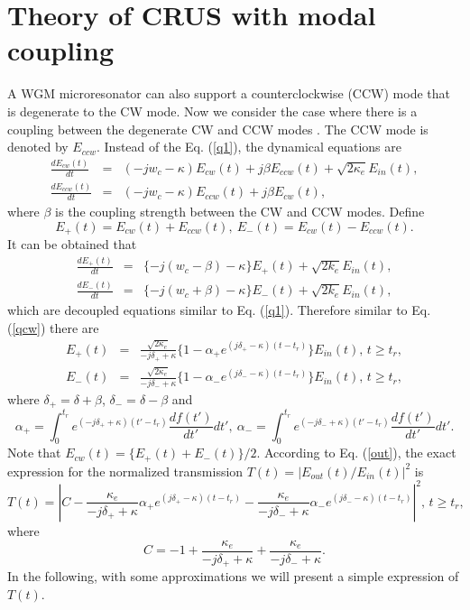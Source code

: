 \documentclass[aps,onecolumn,superscriptaddress,showpacs]{revtex4}
\begin{document}
\section{Theory of CRUS with modal coupling}
A WGM microresonator can also support a counterclockwise (CCW) mode that is degenerate to the CW mode.
Now we consider the case where there is a coupling
between the degenerate CW and CCW modes  \cite{kippenberg2002}. The CCW mode is denoted by $E_{ccw}$. Instead of the Eq. (\ref{q1}), the dynamical equations are  \cite{kippenberg2002}
\begin{eqnarray}
\frac{dE_{cw}(t)}{dt}&=&(-jw_c-\kappa)E_{cw}(t)+j\beta E_{ccw}(t)+ \sqrt{2\kappa_e}E_{in}(t),  \label{qq} \\
\frac{dE_{ccw}(t)}{dt}&=&(-jw_c-\kappa)E_{ccw}(t)+j\beta E_{cw}(t),
\end{eqnarray}
where $\beta$ is the coupling strength between the CW and CCW modes.
Define
\begin{equation}
E_{+}(t)=E_{cw}(t)+ E_{ccw}(t), \:
E_{-}(t)=E_{cw}(t)- E_{ccw}(t).
\end{equation}
It can be obtained that
 \begin{eqnarray}
\frac{dE_{+}(t)}{dt}&=&\{-j(w_c-\beta)-\kappa \}E_{+}(t)+ \sqrt{2k_e}E_{in}(t),  \label{eplus} \\
\frac{dE_{-}(t)}{dt}&=&\{-j(w_c+\beta)-\kappa \} E_{-}(t)+ \sqrt{2k_e}E_{in}(t),\label{eminus}
\end{eqnarray}
which are decoupled equations similar to Eq. (\ref{q1}).
Therefore similar to Eq. (\ref{qcw}) there are
 \begin{eqnarray}
E_{+}(t)&=&\frac{\sqrt{2\kappa_e}}{-j\delta_{+}+\kappa}  \{1-\alpha_{+} e^{(j\delta_{+}-\kappa) (t-t_r) } \}E_{in}(t),\, t\geq t_r, \\
E_{-}(t)&=&\frac{\sqrt{2\kappa_e}}{-j\delta_{-}+\kappa}  \{1-\alpha_{-} e^{(j\delta_{-}-\kappa) (t-t_r) } \}E_{in}(t),\, t\geq t_r,
 \end{eqnarray}
where $\delta_{+}=\delta+\beta$, $\delta_{-}=\delta-\beta$ and
\begin{equation}
\alpha_{+}=\int_{0}^{t_r} e^{(-j\delta_{+}+\kappa)(t'-t_r)}\frac{df(t')}{dt'} dt',  \:
\alpha_{-}=\int_{0}^{t_r} e^{(-j\delta_{-}+\kappa)(t'-t_r)}\frac{df(t')}{dt'} dt'.
\end{equation}
Note that $E_{cw}(t)=\{E_{+}(t)+E_{-}(t)\}/2$.
According to Eq. (\ref{out}), the exact expression for the normalized transmission $T(t)=|E_{out}(t)/E_{in}(t)|^2$ is
 \begin{equation}
T(t)=\left |C-\frac{\kappa_e}{-j\delta_{+}+\kappa}\alpha_{+} e^{(j\delta_{+}-\kappa) (t-t_r) }
-\frac{\kappa_e}{-j\delta_{-}+\kappa}\alpha_{-} e^{(j\delta_{-}-\kappa) (t-t_r) } \right |^2,  \, t\geq t_r, \label{ex}
 \end{equation}
where
\begin{equation}
C=-1+\frac{\kappa_e}{-j\delta_{+}+\kappa}+\frac{\kappa_e}{-j\delta_{-}+\kappa}.
\end{equation}
In the following, with some approximations we will present a simple expression of $T(t)$.
\end{document}
